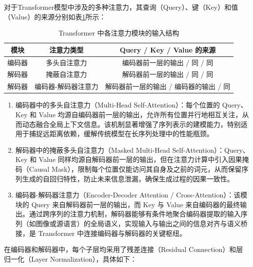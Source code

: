 对于Transformer模型中涉及的多种注意力，其查询（Query）、键（Key）和值（Value）的来源分别如表\ref{tab:attn-structure-simple}所示：
\begin{table}[H]
    \centering
    \caption{Transformer 中各注意力模块的输入结构}
    \begin{tabular}{ccc}
        \toprule
        \textbf{模块} & \textbf{注意力类型} & \textbf{Query / Key / Value 的来源} \\
        \midrule
        编码器 & 多头自注意力 & 编码器前一层的输出 / 同 / 同 \\
        解码器 & 掩蔽自注意力 & 解码器前一层的输出 / 同 / 同 \\
        解码器 & 编码器-解码器注意力 & 解码器前一层的输出 / 编码器的输出 / 同 \\
        \bottomrule
    \end{tabular}
    \label{tab:attn-structure-simple}
\end{table}
\begin{enumerate}[label={（\arabic*）}, leftmargin=2em, labelsep=0.5em, itemsep=0pt]
    \item 编码器中的多头自注意力（Multi-Head Self-Attention）：每个位置的 Query、Key 和 Value 均源自编码器前一层的输出，允许所有位置并行地相互关注，从而动态融合全局上下文信息。该机制显著增强了序列表示的建模能力，特别适用于捕捉远距离依赖，缓解传统模型在长序列处理中的性能瓶颈。
    \item 解码器中的掩蔽多头自注意力（Masked Multi-Head Self-Attention）：Query、Key 和 Value 同样均源自解码器前一层的输出，但在注意力计算中引入因果掩码（Causal Mask），限制每个位置仅能访问其自身及之前的词元，从而保留序列生成的自回归特性，防止未来信息泄漏，确保生成过程的因果一致性。
    \item 编码器-解码器注意力（Encoder-Decoder Attention / Cross-Attention）：该模块的 Query 来自解码器前一层的输出，而 Key 与 Value 来自编码器的最终输出。通过跨序列的注意力机制，解码器能够有条件地聚合编码器提取的输入序列（如图像或源语言）的全局语义，实现输入与输出之间的信息对齐与语义桥接，是 Transformer 中连接编码器与解码器的关键枢纽。
\end{enumerate}
在编码器和解码器中，每个子层均采用了残差连接（Residual Connection）和层归一化（Layer Normalization），具体如下：

